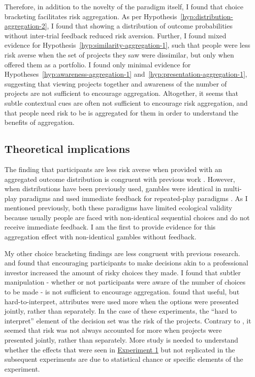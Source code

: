 \documentclass[a4paper, nobind, dvipsnames]{templates/ociamthesis}
\theoremstyle{definition}
\theoremstyle{definition}
\theoremstyle{definition}
\theoremstyle{definition}
\theoremstyle{remark}
\begin{document}
Therefore, in addition to the novelty of the paradigm itself, I found that
choice bracketing facilitates risk aggregation. As per
Hypothesis~\ref{hyp:distribution-aggregation-2}, I found that showing a
distribution of outcome probabilities without inter-trial feedback reduced risk
aversion. Further, I found mixed evidence for
Hypothesis~\ref{hyp:similarity-aggregation-1}, such that people were less risk
averse when the set of projects they saw were dissimilar, but only when offered
them as a portfolio. I found only minimal evidence for
Hypotheses~\ref{hyp:awareness-aggregation-1}
and~\ref{hyp:presentation-aggregation-1}, suggesting that viewing projects
together and awareness of the number of projects are not sufficient to encourage
aggregation. Altogether, it seems that subtle contextual cues are often not
sufficient to encourage risk aggregation, and that people need risk to be is
aggregated for them in order to understand the benefits of aggregation.

\hypertarget{theoretical-implications}{%
\subsection{Theoretical implications}\label{theoretical-implications}}

The finding that participants are less risk averse when provided with an
aggregated outcome distribution is congruent with previous work \autocite[e.g.,][]{redelmeier1992}. However, when distributions have been previously used,
gambles were identical in multi-play paradigms and used immediate feedback for
repeated-play paradigms \autocite[e.g.,][]{benartzi1999}. As I mentioned previously, both
these paradigms have limited ecological validity because usually people are
faced with non-identical sequential choices and do not receive immediate
feedback. I am the first to provide evidence for this aggregation effect with
non-identical gambles without feedback.

My other choice bracketing findings are less congruent with previous research.
\textcite{sokolhessner2009} and \textcite{sokolhessner2012} found that encouraging participants to
make decisions akin to a professional investor increased the amount of risky
choices they made. I found that subtler manipulation - whether or not
participants were aware of the number of choices to be made - is not sufficient
to encourage aggregation. \textcite{hsee1999} found that useful, but hard-to-interpret,
attributes were used more when the options were presented jointly, rather than
separately. In the case of these experiments, the ``hard to interpret'' element of
the decision set was the risk of the projects. Contrary to \textcite{hsee1999}, it seemed
that risk was not always accounted for more when projects were presented
jointly, rather than separately. More study is needed to understand whether the
effects that were seen in \protect\hyperlink{results-aggregation-1}{Experiment 1} but not
replicated in the subsequent experiments are due to statistical chance or
specific elements of the experiment.
\end{document}
